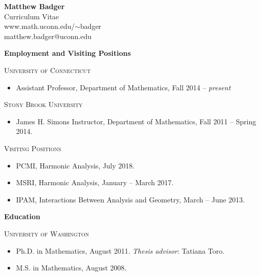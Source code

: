 \documentclass[12pt]{amsart}
\newcommand{\ssection}[1]{\noindent\textbf{#1}\vspace{.2cm}}
\newcommand{\esection}{\vspace{.3cm}}
\newcommand{\svs}{\vspace{.1cm}}
\begin{document}
\vfill

\begin{center}
{\Large\textbf{Matthew Badger}} \vspace{.2cm}\\
{\large Curriculum Vitae} \vspace{.2cm}\\
\textsf{www.math.uconn.edu/$\sim$badger} \vspace{.2cm}\\
\textsf{matthew.badger@uconn.edu} \vspace{.4cm}

\end{center}

\vfill

\ssection{Employment and Visiting Positions}

\textsc{University of Connecticut}

\begin{itemize}
\item Assistant Professor, Department of Mathematics, Fall 2014 -- \emph{present}
\end{itemize}

\svs

\textsc{Stony Brook University} \begin{itemize}
\item James H. Simons Instructor, Department of Mathematics, Fall 2011 -- Spring 2014.
\end{itemize}

\svs

\textsc{Visiting Positions}

\begin{itemize}
\item PCMI, Harmonic Analysis, July 2018.
\item MSRI, Harmonic Analysis, January -- March 2017.
\item IPAM, Interactions Between Analysis and Geometry, March -- June 2013.
\end{itemize}

\esection

\vfill

\ssection{Education}

\noindent \textsc{University of Washington} \begin{itemize}
\item Ph.D. in Mathematics, August 2011. \quad\emph{Thesis advisor}: Tatiana Toro.
\item M.S. in Mathematics, August 2008.
\end{itemize} \vspace{.1cm}
\end{document}
